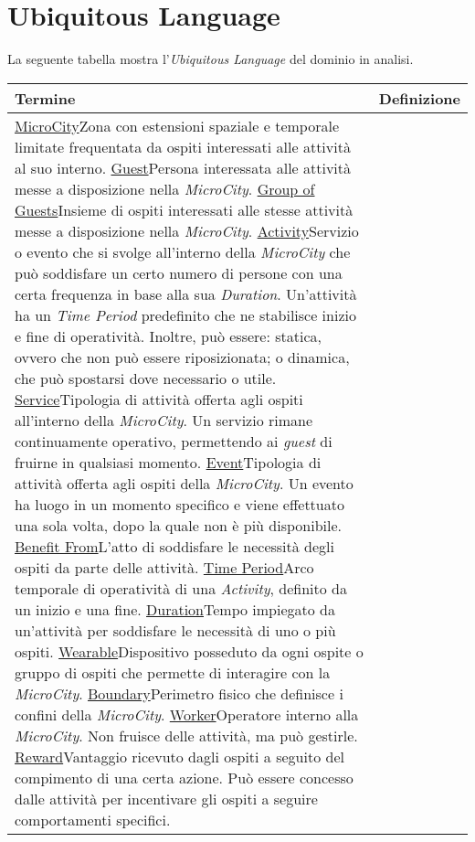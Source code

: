 \section{Ubiquitous Language}

La seguente tabella mostra l'\textit{Ubiquitous Language} del dominio in analisi.

\begin{table}[H]
    \centering
    \begin{tabular}{|l|p{}|}
        \hline
        \textbf{Termine} & \textbf{Definizione}\\
        \hline
        \ul{MicroCity}{Zona con estensioni spaziale e temporale limitate frequentata da ospiti interessati alle attività al suo interno.}
        \ul{Guest}{Persona interessata alle attività messe a disposizione nella \textit{MicroCity}.}
        \ul{Group of Guests}{Insieme di ospiti interessati alle stesse attività messe a disposizione nella \textit{MicroCity}.}
        \ul{Activity}{Servizio o evento che si svolge all'interno della \textit{MicroCity} che può soddisfare un certo numero di persone con una certa frequenza in base alla sua \textit{Duration}. Un'attività ha un \textit{Time Period} predefinito che ne stabilisce inizio e fine di operatività. Inoltre, può essere: statica, ovvero che non può essere riposizionata; o dinamica, che può spostarsi dove necessario o utile.}
        \ul{Service}{Tipologia di attività offerta agli ospiti all'interno della \textit{MicroCity}. Un servizio rimane continuamente operativo, permettendo ai \textit{guest} di fruirne in qualsiasi momento.}
        \ul{Event}{Tipologia di attività offerta agli ospiti della \textit{MicroCity}. Un evento ha luogo in un momento specifico e viene effettuato una sola volta, dopo la quale non è più disponibile.}
        \ul{Benefit From}{L'atto di soddisfare le necessità degli ospiti da parte delle attività.}
        \ul{Time Period}{Arco temporale di operatività di una \textit{Activity}, definito da un inizio e una fine.}
        \ul{Duration}{Tempo impiegato da un'attività per soddisfare le necessità di uno o più ospiti.}
        \ul{Wearable}{Dispositivo posseduto da ogni ospite o gruppo di ospiti che permette di interagire con la \textit{MicroCity}.}
        \ul{Boundary}{Perimetro fisico che definisce i confini della \textit{MicroCity}.}
        \ul{Worker}{Operatore interno alla \textit{MicroCity}. Non fruisce delle attività, ma può gestirle.}
        \ul{Reward}{Vantaggio ricevuto dagli ospiti a seguito del compimento di una certa azione. Può essere concesso dalle attività per incentivare gli ospiti a seguire comportamenti specifici.}

\end{tabular}
\end{table}
